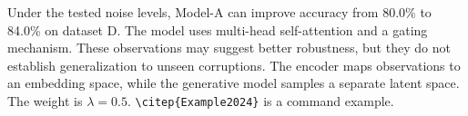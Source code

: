 \documentclass{article}
\newcommand{\modelname}{Model-A}
\begin{document}
Under the tested noise levels, \modelname{} can improve accuracy from
80.0\% to 84.0\% on dataset D. The model uses multi-head self-attention
and a gating mechanism. These observations may suggest better robustness,
but they do not establish generalization to unseen corruptions.
The encoder maps observations to an embedding space, while the generative
model samples a separate latent space. The weight is $\lambda=0.5$.
\verb|\citep{Example2024}| is a command example.
\end{document}

